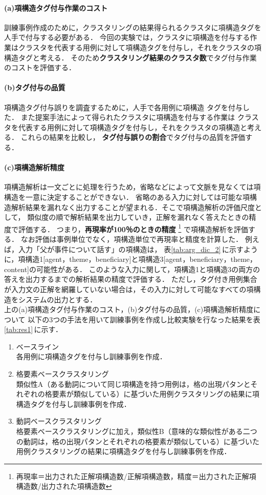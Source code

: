 \paragraph{(a)項構造タグ付与作業のコスト}
訓練事例作成のために，クラスタリングの結果得られるクラスタに項構造タグを人手で付与する必要がある．
今回の実験では，クラスタに項構造を付与する作業はクラスタを代表する用例に対して項構造タグを付与し，それをクラスタの項構造タグと考える．
そのため\textbf{クラスタリング結果のクラスタ数}でタグ付与作業のコストを評価する．
\paragraph{(b)タグ付与の品質}
項構造タグ付与誤りを調査するために，人手で各用例に項構造
タグを付与した．
また提案手法によって得られたクラスタに項構造を付与する作業は
クラスタを代表する用例に対して項構造タグを付与し，それをクラスタの項構造と考える．
これらの結果を比較し，
\textbf{タグ付与誤りの割合}でタグ付与の品質を評価する．
\paragraph{(c)項構造解析精度}
項構造解析は一文ごとに処理を行うため，省略などによって文脈を見なくては項構造を一意に決定することができない．
省略のある入力に対しては可能な項構造解析結果を漏れなく出力することが望まれる．そこで項構造解析の評価尺度として，
類似度の順で解析結果を出力していき，正解を漏れなく答えたときの精度で評価する．
つまり，{\bf 再現率が100％のときの精度}
\footnote{再現率＝出力された正解項構造数/正解項構造数，精度＝出力された正解項構造数/出力された項構造数}
で項構造解析を評価する．
なお評価は事例単位でなく，項構造単位で再現率と精度を計算した．
例えば，入力「父が事件について話す」の項構造は，
表\ref{tab:arg_dic_2}\,に示すように，項構造1[agent，theme，beneficiary]と項構造3[agent，beneficiary，theme，content]の可能性がある．
このような入力に関して，項構造1と項構造3の両方の答えを出力するまでの解析結果の精度で評価する．
ただし，タグ付き用例集合が入力文の正解を網羅していない場合は，その入力に対して可能なすべての項構造をシステムの出力とする．\\

上の(a)項構造タグ付与作業のコスト，(b)タグ付与の品質，(c)項構造解析精度について
以下の3つの手法を用いて訓練事例を作成し比較実験を行なった結果を表\ref{tab:res1}\,に示す．


\begin{enumerate}
\item ベースライン\\各用例に項構造タグを付与し訓練事例を作成．
\item 格要素ベースクラスタリング\\類似性A（ある動詞について同じ項構造を持つ用例は，格の出現パタンとそれぞれの格要素が類似している）に基づいた用例クラスタリングの結果に項構造タグを付与し訓練事例を作成．
\item 動詞ベースクラスタリング\\格要素ベースクラスタリングに加え，類似性B（意味的な類似性がある二つの動詞は，格の出現パタンとそれぞれの格要素が類似している）に基づいた用例クラスタリングの結果に項構造タグを付与し訓練事例を作成．
\end{enumerate}

